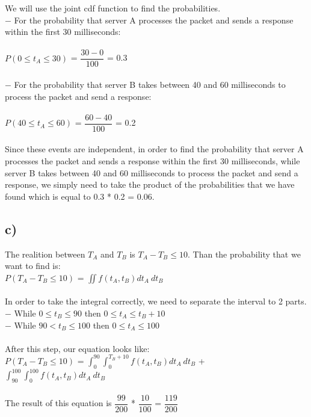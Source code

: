 \documentclass[12pt]{article}
\begin{document}
We will use the joint cdf function to find the probabilities.\\
$-$ For the probability that server A processes the packet and sends a response within the first 30 milliseconds:\\
\\
$P(0 \leq t_A \leq 30)$ = $\dfrac{30 - 0}{100}$ = 0.3\\
\\
$-$ For the probability that  server B takes between 40 and 60 milliseconds to process the packet and send a response:\\
\\
$P(40 \leq t_A \leq 60)$ = $\dfrac{60 - 40}{100}$ = 0.2\\
\\
Since these events are independent, in order to find the probability that server A processes the packet and sends a response within the first
30 milliseconds, while server B takes between 40 and 60 milliseconds to process the packet and send a response, we simply need to take the product of the probabilities that we have found which is equal to 0.3 * 0.2 = 0.06.\\


\subsection*{c)} 

The realition between $T_A$ and $T_B$ is $T_A - T_B \leq 10$. Than the probability that we want to find is:\\
$P(T_A - T_B \leq 10)$ = $\iint f(t_A , t_B ) dt_A \ dt_B $\\
\\
In order to take the integral correctly, we need to separate the interval to 2 parts.\\
$-$ While $0 \leq t_B \leq 90$ then $0 \leq t_A \leq t_B + 10$\\
$-$ While $90 < t_B \leq 100$ then $0 \leq t_A \leq 100$\\
\\
After this step, our equation looks like:\\
$P(T_A - T_B \leq 10)$ = $\int_{0}^{90} \int_{0}^{T_B + 10} f(t_A , t_B ) dt_A \ dt_B $ + $\int_{90}^{100} \int_{0}^{100} f(t_A , t_B ) dt_A \ dt_B $\\
\\
The result of this equation is $\dfrac{99}{200}$ * $\dfrac{10}{100}$ = $\dfrac{119}{200}$ \\
\end{document}
